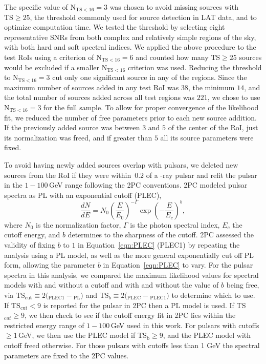 The specific value of $\mathrm{N_{TS < 16} = 3}$ was chosen to avoid missing sources with $\mathrm{TS \geq 25}$, the threshold commonly used for source detection in LAT data, and to optimize computation time. We tested the threshold by selecting eight representative SNRs from both complex and relatively simple regions of the sky, with both hard and soft spectral indices. We applied the above procedure to the test RoIs using a criterion of $\mathrm{N_{TS < 16} = 6}$ and counted how many $\mathrm{TS \geq 25}$ sources would be excluded if a smaller $\mathrm{N_{TS < 16}}$ criterion was used. Reducing the threshold to $\mathrm{N_{TS < 16} = 3}$ cut only one significant source in any of the regions. Since the maximum number of sources added in any test RoI was $38$, the minimum $14$, and the total number of sources added across all test regions was $221$, we chose to use $\mathrm{N_{TS < 16} = 3}$ for the full sample. To allow for proper convergence of the likelihood fit, we reduced the number of free parameters prior to each new source addition. If the previously added source was between $3$\degr{} and $5$\degr{} of the center of the RoI, just its normalization was freed, and if greater than $5$\degr{} all its source parameters were fixed.

To avoid having newly added sources overlap with pulsars, we deleted new sources from the RoI if they were within~$0.2$\degr{} of a \g-ray pulsar and refit the pulsar in the $1-100$\,GeV range following the 2PC conventions. 
2PC modeled pulsar spectra as PL with an exponential cutoff (PLEC),
\begin{equation}
	\newcommand{\pfrac}[2]{\left(\frac{#1}{#2}\right)} \frac{dN}{dE} = N_0 \pfrac{E}{E_0}^{-\Gamma} \exp\left(-\frac{E}{E_c}\right)^{b},
	\label{eqn:PLEC}
\end{equation}
where \textit{$N_0$} is the normalization factor, \textit{$\Gamma$} is the photon spectral index, \textit{$E_c$} the cutoff energy, and $b$ determines to the sharpness of the cutoff. 2PC assessed the validity of fixing $b$ to $1$ in Equation~\ref{eqn:PLEC} (PLEC1) 
by repeating the analysis using a PL model, as well as the more general exponentially cut off PL form, allowing the parameter $b$ in Equation~\ref{eqn:PLEC} to vary. For the pulsar spectra in this analysis, we compared the maximum likelihood values for spectral models with and without a cutoff and with and without the value of $b$ being free, via %
$\mathrm{TS_{cut}} \equiv 2 ($\logL{}$_{\mathrm{PLEC1}}-$\logL{}$_{\mathrm{PL}})$ and $\mathrm{TS}_{b} \equiv 2 ($\logL{}$_{\mathrm{PLEC}}-$\logL{}$_{\mathrm{PLEC1}})$ to determine which to use. If $\mathrm{TS_{cut}} < 9$ is reported for the pulsar in 2PC then a PL model is used. If TS$_{\mathrm cut} \geq 9$, we then check to see if the cutoff energy fit in 2PC lies within the restricted energy range of $1-100$\,GeV used in this work. For pulsars with cutoffs $\geq 1$\,GeV, we then use the PLEC model if TS$_{\mathrm b} \geq 9$, and the PLEC model with cutoff freed otherwise. %
For those pulsars with cutoffs less than 1 GeV the spectral parameters are fixed to the 2PC values.

